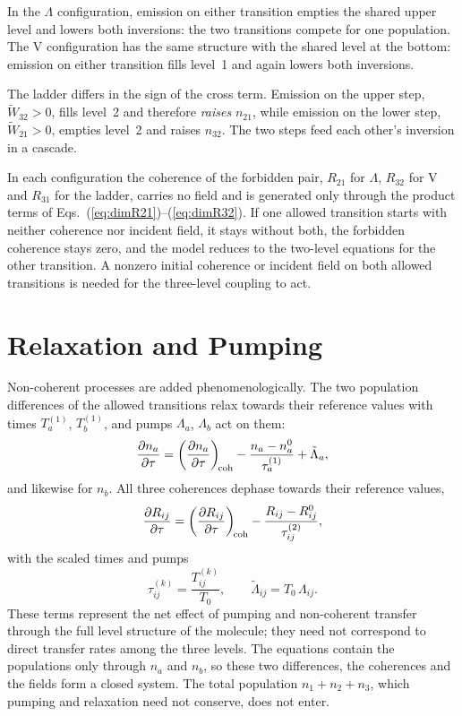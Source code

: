 \documentclass[12pt,a4paper]{article}
\newcommand{\T}{T_0}
\newcommand{\tW}{\tilde{W}}
\begin{document}
In the $\Lambda$ configuration, emission on either transition empties the
shared upper level and lowers both inversions: the two transitions compete
for one population. The V configuration has the same structure with the
shared level at the bottom: emission on either transition fills level~1 and
again lowers both inversions.

The ladder differs in the sign of the cross term. Emission on the upper step,
$\tW_{32} > 0$, fills level~2 and therefore \emph{raises} $n_{21}$, while
emission on the lower step, $\tW_{21} > 0$, empties level~2 and raises
$n_{32}$. The two steps feed each other's inversion in a cascade.

In each configuration the coherence of the forbidden pair, $R_{21}$ for
$\Lambda$, $R_{32}$ for V and $R_{31}$ for the ladder, carries no field and is
generated only through the product terms of
Eqs.~(\ref{eq:dimR21})--(\ref{eq:dimR32}). If one allowed transition starts
with neither coherence nor incident field, it stays without both, the
forbidden coherence stays zero, and the model reduces to the two-level
equations for the other transition. A nonzero initial coherence or incident
field on both allowed transitions is needed for the three-level coupling to
act.

\section{Relaxation and Pumping}
\label{sec:relax}

Non-coherent processes are added phenomenologically. The two population
differences of the allowed transitions relax towards their reference values
with times $T_a^{(1)}$, $T_b^{(1)}$, and pumps $\Lambda_a$, $\Lambda_b$ act on
them:
\begin{equation}
  \dfrac{\partial n_a}{\partial \tau} = \left(\dfrac{\partial n_a}{\partial \tau}\right)_{\!\text{coh}}
     - \frac{n_a - n_a^0}{\tau_a^{(1)}} + \tilde{\Lambda}_a ,
  \label{eq:relaxn}
\end{equation}
and likewise for $n_b$. All three coherences dephase towards their reference
values,
\begin{equation}
  \dfrac{\partial R_{ij}}{\partial \tau} = \left(\dfrac{\partial R_{ij}}{\partial \tau}\right)_{\!\text{coh}}
     - \frac{R_{ij} - R_{ij}^0}{\tau_{ij}^{(2)}} ,
  \label{eq:relaxR}
\end{equation}
with the scaled times and pumps
\begin{equation}
  \tau_{ij}^{(k)} = \frac{T_{ij}^{(k)}}{\T}, \qquad
  \tilde{\Lambda}_{ij} = \T\,\Lambda_{ij}.
\end{equation}
These terms represent the net effect of pumping and non-coherent transfer
through the full level structure of the molecule; they need not correspond to
direct transfer rates among the three levels. The equations contain the
populations only through $n_a$ and $n_b$, so these two differences, the
coherences and the fields form a closed system. The total population
$n_1 + n_2 + n_3$, which pumping and relaxation need not conserve, does not
enter.
\end{document}
